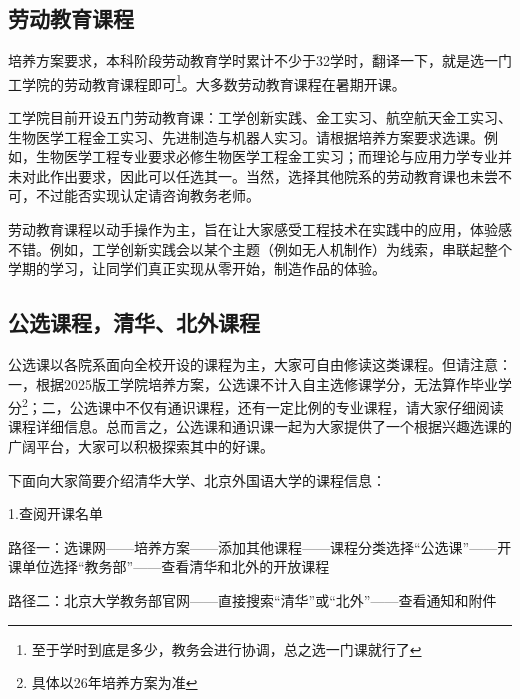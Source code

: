 \documentclass[11pt,oneside]{book}
\begin{document}
\subsection{劳动教育课程}
培养方案要求，本科阶段劳动教育学时累计不少于32学时，翻译一下，就是选一门工学院的劳动教育课程即可\footnote{至于学时到底是多少，教务会进行协调，总之选一门课就行了}。大多数劳动教育课程在暑期开课。

\vspace{10pt}

工学院目前开设五门劳动教育课：工学创新实践、金工实习、航空航天金工实习、生物医学工程金工实习、先进制造与机器人实习。请根据培养方案要求选课。例如，生物医学工程专业要求必修生物医学工程金工实习；而理论与应用力学专业并未对此作出要求，因此可以任选其一。当然，选择其他院系的劳动教育课也未尝不可，不过能否实现认定请咨询教务老师。

\vspace{10pt}

劳动教育课程以动手操作为主，旨在让大家感受工程技术在实践中的应用，体验感不错。例如，工学创新实践会以某个主题（例如无人机制作）为线索，串联起整个学期的学习，让同学们真正实现从零开始，制造作品的体验。

\subsection{公选课程，清华、北外课程}
公选课以各院系面向全校开设的课程为主，大家可自由修读这类课程。但请注意：一，根据2025版工学院培养方案，公选课不计入自主选修课学分，无法算作毕业学分\footnote{具体以26年培养方案为准}；二，公选课中不仅有通识课程，还有一定比例的专业课程，请大家仔细阅读课程详细信息。总而言之，公选课和通识课一起为大家提供了一个根据兴趣选课的广阔平台，大家可以积极探索其中的好课。

\vspace{10pt}

下面向大家简要介绍清华大学、北京外国语大学的课程信息：

\vspace{10pt}

1.查阅开课名单

\vspace{10pt}

路径一：选课网——培养方案——添加其他课程——课程分类选择“公选课”——开课单位选择“教务部”——查看清华和北外的开放课程

\vspace{10pt}

路径二：北京大学教务部官网——直接搜索“清华”或“北外”——查看通知和附件
\end{document}
